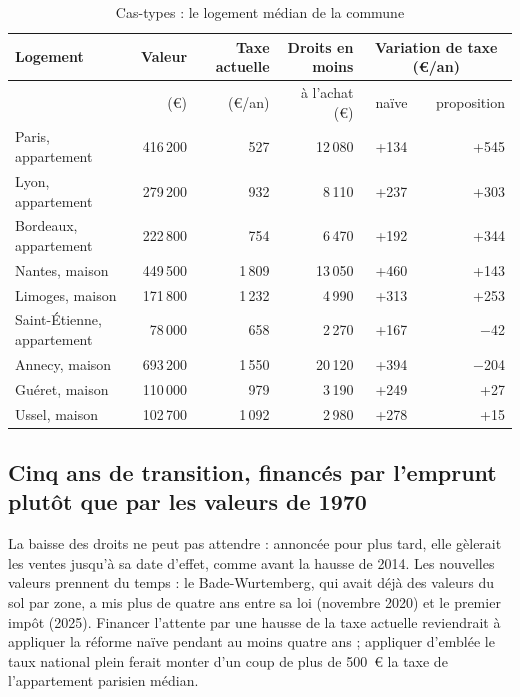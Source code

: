 \begin{table}[!htbp]\centering\scriptsize
\caption{Cas-types : le logement médian de la commune}\label{tab:fon_cas}
\begin{tabularx}{\linewidth}{@{}>{\raggedright\arraybackslash}X rrrrr@{}}
\toprule
Logement & Valeur & Taxe actuelle & Droits en moins & \multicolumn{2}{c}{Variation de taxe (€/an)} \\
\cmidrule(l){5-6}
 & (€) & (€/an) & à l'achat (€) & naïve & proposition \\
\midrule
Paris, appartement & 416\,200 & 527 & 12\,080 & +134 & +545 \\
Lyon, appartement & 279\,200 & 932 & 8\,110 & +237 & +303 \\
Bordeaux, appartement & 222\,800 & 754 & 6\,470 & +192 & +344 \\
Nantes, maison & 449\,500 & 1\,809 & 13\,050 & +460 & +143 \\
Limoges, maison & 171\,800 & 1\,232 & 4\,990 & +313 & +253 \\
Saint-Étienne, appartement & 78\,000 & 658 & 2\,270 & +167 & $-$42 \\
Annecy, maison & 693\,200 & 1\,550 & 20\,120 & +394 & $-$204 \\
Guéret, maison & 110\,000 & 979 & 3\,190 & +249 & +27 \\
Ussel, maison & 102\,700 & 1\,092 & 2\,980 & +278 & +15 \\
\bottomrule
\end{tabularx}
\par\vspace{2pt}{\raggedright\scriptsize Valeur : prix médian au m² des ventes 2023-2024 × surface médiane ; taxe
de 2025 ; droits au taux permanent ; sans effet sur les prix ni reprise des ventes.\par}
\end{table}

\subsection{Cinq ans de transition, financés par l'emprunt plutôt que par les valeurs de 1970}

La baisse des droits ne peut pas attendre : annoncée pour plus tard, elle gèlerait les ventes jusqu'à sa date d'effet,
comme avant la hausse de 2014. Les nouvelles valeurs prennent du temps : le Bade-Wurtemberg, qui avait déjà des valeurs
du sol par zone, a mis plus de quatre ans entre sa loi (novembre 2020) et le premier impôt (2025). Financer l'attente par
une hausse de la taxe actuelle reviendrait à appliquer la réforme naïve pendant au moins quatre ans ; appliquer d'emblée
le taux national plein ferait monter d'un coup de plus de 500~€ la taxe de l'appartement parisien médian.


